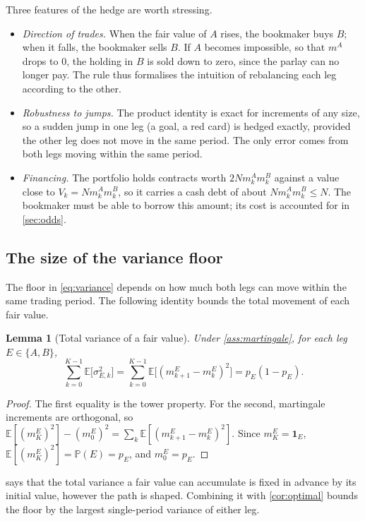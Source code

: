 \documentclass[11pt,a4paper]{article}
\theoremstyle{plain}
\newtheorem{lemma}[theorem]{Lemma}
\theoremstyle{definition}
\theoremstyle{remark}
\newcommand{\E}{\mathbb{E}}
\newcommand{\Prob}{\mathbb{P}}
\newcommand{\1}{\mathbf{1}}
\begin{document}
Three features of the hedge are worth stressing.
\begin{itemize}
  \item \emph{Direction of trades.} When the fair value of $A$ rises, the bookmaker buys $B$; when it falls, the bookmaker sells $B$. If $A$ becomes impossible, so that $m^A$ drops to $0$, the holding in $B$ is sold down to zero, since the parlay can no longer pay. The rule thus formalises the intuition of rebalancing each leg according to the other.
  \item \emph{Robustness to jumps.} The product identity is exact for increments of any size, so a sudden jump in one leg (a goal, a red card) is hedged exactly, provided the other leg does not move in the same period. The only error comes from both legs moving within the same period.
  \item \emph{Financing.} The portfolio holds contracts worth $2Nm^A_km^B_k$ against a value close to $V_k = Nm^A_km^B_k$, so it carries a cash debt of about $Nm^A_km^B_k\leq N$. The bookmaker must be able to borrow this amount; its cost is accounted for in \cref{sec:odds}.
\end{itemize}

\subsection{The size of the variance floor}

The floor in \eqref{eq:variance} depends on how much both legs can move within the same trading period. The following identity bounds the total movement of each fair value.

\begin{lemma}[Total variance of a fair value]
\label{lem:total-variance}
Under \cref{ass:martingale}, for each leg $E\in\{A,B\}$,
\[
\sum_{k=0}^{K-1}\E\bigl[\sigma^2_{E,k}\bigr] = \sum_{k=0}^{K-1}\E\bigl[(m^E_{k+1}-m^E_k)^2\bigr] = p_E(1-p_E).
\]
\end{lemma}

\begin{proof}
The first equality is the tower property. For the second, martingale increments are orthogonal, so $\E[(m^E_K)^2] - (m^E_0)^2 = \sum_k\E[(m^E_{k+1}-m^E_k)^2]$. Since $m^E_K = \1_E$, $\E[(m^E_K)^2] = \Prob(E) = p_E$, and $m^E_0 = p_E$.
\end{proof}

 says that the total variance a fair value can accumulate is fixed in advance by its initial value, however the path is shaped. Combining it with \cref{cor:optimal} bounds the floor by the largest single-period variance of either leg.
\end{document}
